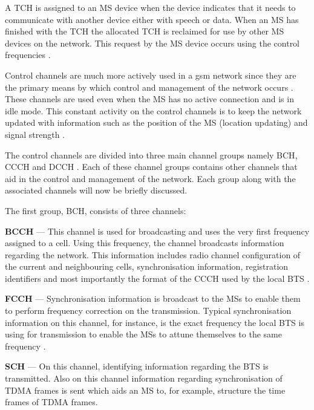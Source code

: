 A \gls{TCH} is assigned to an \gls{MS} device when the device indicates that it needs to communicate with another device either with speech or data. When an \gls{MS} has finished with the \gls{TCH} the allocated \gls{TCH} is reclaimed for use by other \gls{MS} devices on the network. This request by the \gls{MS} device occurs using the control frequencies \cite{GSMArchitectureProtocolsServices}.

Control channels are much more actively used in a \gls{gsm} network since they are the primary means by which control and management of the network occurs \cite{GSMArchitectureProtocolsServices}. These channels are used even when the \gls{MS} has no active connection and is in idle mode. This constant activity on the control channels is to keep the network updated with information such as the position of the \gls{MS} (location updating) and signal strength \cite{GSMArchitectureProtocolsServices,GSMSysEngin,Eisenblatter}. 

The control channels are divided into three main channel groups namely \gls{BCH}, \gls{CCCH} and \gls{DCCH} \cite{GSMArchitectureProtocolsServices}. Each of these channel groups contains other channels that aid in the control and management of the network. Each group along with the associated channels will now be briefly discussed.

The first group, \gls{BCH}, consists of three channels:
\begin{description}
  \item{\textbf{\Gls{BCCH}}} --- This channel is used for broadcasting and uses the very first frequency assigned to a cell. Using this frequency, the channel broadcasts information regarding the network. This information includes radio channel configuration of the current and neighbouring cells, synchronisation information, registration identifiers and most importantly the format of the \gls{CCCH} used by the local \gls{BTS} \cite{GSMArchitectureProtocolsServices}.
  \item{\textbf{\Gls{FCCH}}} --- Synchronisation information is broadcast to the \glspl{MS} to enable them to perform frequency correction on the transmission. Typical synchronisation information on this channel, for instance, is the exact frequency the local \gls{BTS} is using for transmission to enable the \glspl{MS} to attune themselves to the same frequency \cite{GSMArchitectureProtocolsServices}.
  \item{\textbf{\Gls{SCH}}} --- On this channel, identifying information regarding the \gls{BTS} is transmitted. Also on this channel information regarding synchronisation of \gls{TDMA} frames is sent which aids an \gls{MS} to, for example, structure the time frames of \gls{TDMA} frames.
\end{description}

